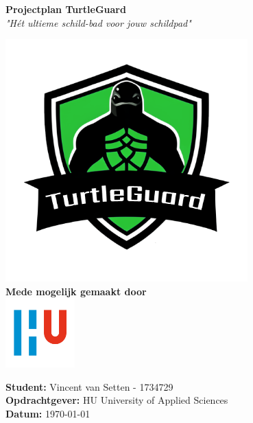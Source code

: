 \documentclass[a4paper]{report}
\newcommand{\turtleguard}{\mbox{TurtleGuard\texttrademark}\xspace}
\begin{document}
\begin{titlepage}
    \begin{center}
        \vspace*{.9cm}
        \Huge
        \textbf{ Projectplan \turtleguard }\\
        \vspace{0.2cm}
        \small\textit{"Hét ultieme schild-bad voor jouw schildpad"}

        \normalsize


        
        \includegraphics[width=0.7\textwidth]{Images/turtleguard.png}
        \vspace{1cm}
        \Large\\
        \textbf{Mede mogelijk gemaakt door} \\
        \includegraphics[width=0.2\textwidth]{Images/logouni.png}


        \vfill
      \end{center}
        \textbf{Student:} Vincent van Setten - 1734729 \\
        \textbf{Opdrachtgever:} HU University of Applied Sciences\\
        \textbf{Datum:} \today \\
        \vspace{2cm}
\end{titlepage}
\end{document}
